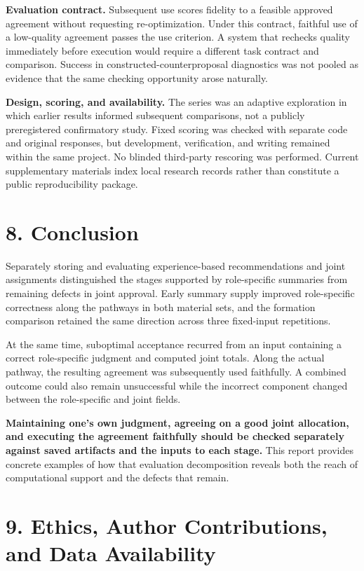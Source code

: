 \documentclass[10pt,a4paper]{article}
\begin{document}
\textbf{Evaluation contract.} Subsequent use scores fidelity to a feasible approved agreement without requesting re-optimization. Under this contract, faithful use of a low-quality agreement passes the use criterion. A system that rechecks quality immediately before execution would require a different task contract and comparison. Success in constructed-counterproposal diagnostics was not pooled as evidence that the same checking opportunity arose naturally.

\textbf{Design, scoring, and availability.} The series was an adaptive exploration in which earlier results informed subsequent comparisons, not a publicly preregistered confirmatory study. Fixed scoring was checked with separate code and original responses, but development, verification, and writing remained within the same project. No blinded third-party rescoring was performed. Current supplementary materials index local research records rather than constitute a public reproducibility package.

\section{8. Conclusion}\label{paper-03-conclusion}

Separately storing and evaluating experience-based recommendations and joint assignments distinguished the stages supported by role-specific summaries from remaining defects in joint approval. Early summary supply improved role-specific correctness along the pathways in both material sets, and the formation comparison retained the same direction across three fixed-input repetitions.

At the same time, suboptimal acceptance recurred from an input containing a correct role-specific judgment and computed joint totals. Along the actual pathway, the resulting agreement was subsequently used faithfully. A combined outcome could also remain unsuccessful while the incorrect component changed between the role-specific and joint fields.

\textbf{Maintaining one's own judgment, agreeing on a good joint allocation, and executing the agreement faithfully should be checked separately against saved artifacts and the inputs to each stage.} This report provides concrete examples of how that evaluation decomposition reveals both the reach of computational support and the defects that remain.

\section{9. Ethics, Author Contributions, and Data Availability}\label{paper-03-ethics-author-contributions-and-data-availability}
\end{document}

